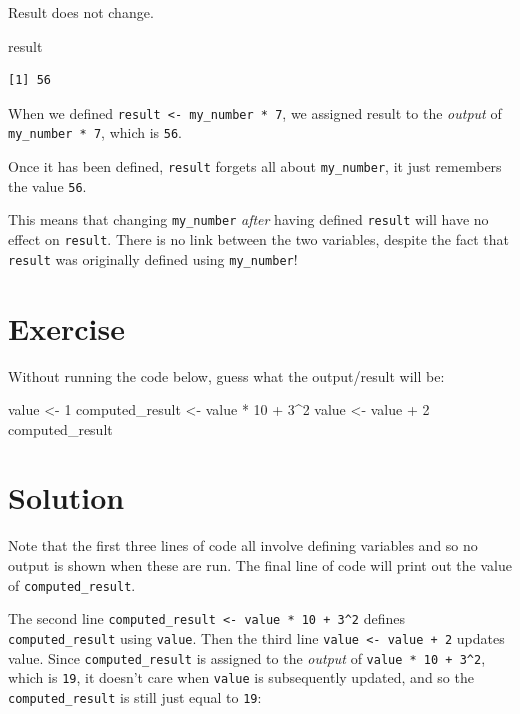 \documentclass[
  letterpaper,
  DIV=11,
  numbers=noendperiod]{scrreprt}
\newenvironment{Shaded}{\begin{snugshade}}{\end{snugshade}}
\newcommand{\DecValTok}[1]{\textcolor[rgb]{0.68,0.00,0.00}{#1}}
\newcommand{\NormalTok}[1]{\textcolor[rgb]{0.00,0.23,0.31}{#1}}
\newcommand{\OtherTok}[1]{\textcolor[rgb]{0.00,0.23,0.31}{#1}}
\newcommand{\SpecialCharTok}[1]{\textcolor[rgb]{0.37,0.37,0.37}{#1}}
\begin{document}
Result does not change.

\begin{Shaded}
\begin{Highlighting}[]
\NormalTok{result}
\end{Highlighting}
\end{Shaded}

\begin{verbatim}
[1] 56
\end{verbatim}

When we defined \texttt{result\ \textless{}-\ my\_number\ *\ 7}, we
assigned result to the \emph{output} of \texttt{my\_number\ *\ 7}, which
is \texttt{56}.

Once it has been defined, \texttt{result} forgets all about
\texttt{my\_number}, it just remembers the value \texttt{56}.

This means that changing \texttt{my\_number} \emph{after} having defined
\texttt{result} will have no effect on \texttt{result}. There is no link
between the two variables, despite the fact that \texttt{result} was
originally defined using \texttt{my\_number}!

\section{Exercise}

Without running the code below, guess what the output/result will be:

\begin{Shaded}
\begin{Highlighting}[]
\NormalTok{value }\OtherTok{\textless{}{-}} \DecValTok{1}
\NormalTok{computed\_result }\OtherTok{\textless{}{-}}\NormalTok{ value }\SpecialCharTok{*} \DecValTok{10} \SpecialCharTok{+} \DecValTok{3}\SpecialCharTok{\^{}}\DecValTok{2}
\NormalTok{value }\OtherTok{\textless{}{-}}\NormalTok{ value }\SpecialCharTok{+} \DecValTok{2}
\NormalTok{computed\_result }
\end{Highlighting}
\end{Shaded}

\section{Solution}

Note that the first three lines of code all involve defining variables
and so no output is shown when these are run. The final line of code
will print out the value of \texttt{computed\_result}.

The second line
\texttt{computed\_result\ \textless{}-\ value\ *\ 10\ +\ 3\^{}2} defines
\texttt{computed\_result} using \texttt{value}. Then the third line
\texttt{value\ \textless{}-\ value\ +\ 2} updates value. Since
\texttt{computed\_result} is assigned to the \emph{output} of
\texttt{value\ *\ 10\ +\ 3\^{}2}, which is \texttt{19}, it doesn't care
when \texttt{value} is subsequently updated, and so the
\texttt{computed\_result} is still just equal to \texttt{19}:
\end{document}

